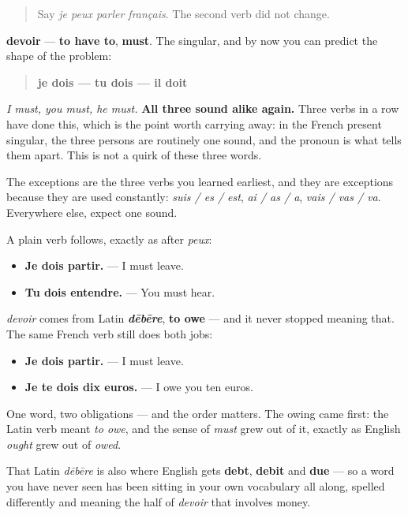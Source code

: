 \begin{quote}
Say \emph{je peux parler français}. The second verb did not change.
\end{quote}

\begin{cousinweb}
\textbf{devoir} — \textbf{to have to}, \textbf{must}. The singular, and by now you can predict the shape of the problem:

\begin{quote}
\textbf{je dois — tu dois — il doit}
\end{quote}

\emph{I must, you must, he must.} \textbf{All three sound alike again.} Three verbs in a row have done this, which is the point worth carrying away: in the French present singular, the three persons are routinely one sound, and the pronoun is what tells them apart. This is not a quirk of these three words.

The exceptions are the three verbs you learned earliest, and they are exceptions because they are used constantly: \emph{suis / es / est}, \emph{ai / as / a}, \emph{vais / vas / va}. Everywhere else, expect one sound.

A plain verb follows, exactly as after \emph{peux}:

\begin{itemize}
\raggedright
  \item \textbf{Je dois partir.} — I must leave.
  \item \textbf{Tu dois entendre.} — You must hear.
\end{itemize}
\end{cousinweb}

\begin{culture}
\emph{devoir} comes from Latin \emph{\textbf{dēbēre}}, \textbf{to owe} — and it never stopped meaning that. The same French verb still does both jobs:

\begin{itemize}
\raggedright
  \item \textbf{Je dois partir.} — I must leave.
  \item \textbf{Je te dois dix euros.} — I owe you ten euros.
\end{itemize}

One word, two obligations — and the order matters. The owing came first: the Latin verb meant \emph{to owe}, and the sense of \emph{must} grew out of it, exactly as English \emph{ought} grew out of \emph{owed}.

That Latin \emph{dēbēre} is also where English gets \textbf{debt}, \textbf{debit} and \textbf{due} — so a word you have never seen has been sitting in your own vocabulary all along, spelled differently and meaning the half of \emph{devoir} that involves money.
\end{culture}

